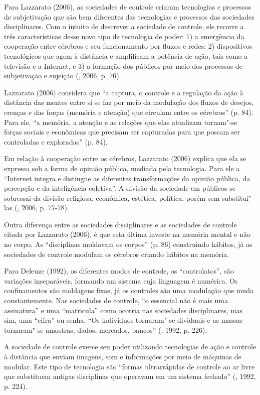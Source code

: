 Para Lazzarato (2006), as sociedades de controle criaram tecnologias e
processos de subjetivação que são bem diferentes das tecnologias e
processos das sociedades disciplinares. Com o intuito de descrever a
sociedade de controle, ele recorre a três características desse novo
tipo de tecnologia de poder: 1) a emergência da cooperação entre
cérebros e seu funcionamento por fluxos e redes; 2) dispositivos
tecnológicos que agem à distância e amplificam a potência de ação, tais
como a televisão e a Internet, e 3) a formação dos públicos por meio dos
processos de subjetivação e sujeição (, 2006, p. 76).

Lazzarato (2006) considera que ``a captura, o controle e a regulação da
ação à distância das mentes entre si se faz por meio da modulação dos
fluxos de desejos, crenças e das forças (memória e atenção) que circulam
entre os cérebros'' (p. 84). Para ele, ``a memória, a atenção e as
relações que elas atualizam tornam"-se forças sociais e econômicas que
precisam ser capturadas para que possam ser controladas e exploradas''
(p. 84).

Em relação à cooperação entre os cérebros, Lazzarato (2006) explica que
ela se expressa sob a forma de opinião pública, mediada pela tecnologia.
Para ele a ``Internet integra e distingue as diferentes transformações
da opinião pública, da percepção e da inteligência coletiva''. A divisão
da sociedade em públicos se sobressai da divisão religiosa, econômica,
estética, política, porém sem substituí"-las (, 2006, p. 77-78).

Outra diferença entre as sociedades disciplinares e as sociedades de
controle citada por Lazzarato (2006), é que esta última investe na
memória mental e não no corpo. As ``disciplinas moldavam os corpos''
(p. 86) construindo hábitos, já as sociedades de controle modulam os
cérebros criando hábitos na memória.

Para Deleuze (1992), os diferentes modos de controle, os
``controlatos'', são variações inseparáveis, formando um sistema cuja
linguagem é numérica. Os confinamentos são moldagens fixas, já os
controles são uma modulação que muda constantemente. Nas sociedades de
controle, ``o essencial não é mais uma assinatura'' e uma ``matricula''
como ocorria nas sociedades disciplinares, mas sim, uma ``cifra'' ou
senha. ``Os indivíduos tornaram"-se dividuais e as massas tornaram"-se
amostras, dados, mercados, bancos'' (, 1992, p. 226).

A sociedade de controle exerce seu poder utilizando tecnologias de ação
e controle à distância que enviam imagens, som e informações por meio de
máquinas de modular. Este tipo de tecnologia são ``formas ultrarrápidas
de controle ao ar livre que substituem antigas disciplinas que operavam
em um sistema fechado'' (, 1992, p. 224).

